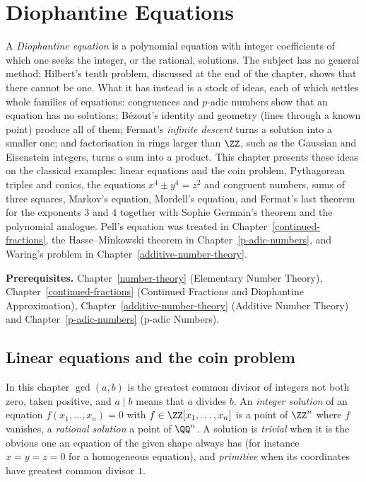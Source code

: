 \chapter{Diophantine Equations}\label{diophantine-equations}

A \emph{Diophantine equation} is a polynomial equation with integer coefficients of which one seeks the integer, or the rational, solutions. The subject has no general method; Hilbert's tenth problem,
discussed at the end of the chapter, shows that there cannot be one. What it has instead is a stock of ideas, each of which settles whole families of equations: congruences and $p$-adic numbers show that an
equation has no solutions; Bézout's identity and geometry (lines through a known point) produce all of them; Fermat's \emph{infinite descent} turns a solution into a smaller one; and factorisation in rings
larger than $\ZZ$, such as the Gaussian and Eisenstein integers, turns a sum into a product. This chapter presents these ideas on the classical examples: linear equations and the coin problem, Pythagorean
triples and conics, the equations $x^4 \pm y^4 = z^2$ and congruent numbers, sums of three squares, Markov's equation, Mordell's equation, and Fermat's last theorem for the exponents $3$ and $4$ together with
Sophie Germain's theorem and the polynomial analogue. Pell's equation was treated in Chapter~\ref{continued-fractions}, the Hasse--Minkowski theorem in Chapter~\ref{p-adic-numbers}, and Waring's problem in
Chapter~\ref{additive-number-theory}.

\noindent\textbf{Prerequisites.} Chapter~\ref{number-theory} (Elementary Number Theory), Chapter~\ref{continued-fractions} (Continued Fractions and Diophantine Approximation), Chapter~\ref{additive-number-theory} (Additive Number Theory) and Chapter~\ref{p-adic-numbers} (p-adic Numbers).

\section{Linear equations and the coin problem}\label{diophantine-equations:section-linear}

\begin{notation}\label{diophantine-equations:notation-diophantine}
In this chapter $\gcd(a, b)$ is the greatest common divisor of integers not both zero, taken positive, and $a \mid b$ means that $a$ divides $b$. An \emph{integer solution} of an equation
$f(x_1, \dots, x_n) = 0$ with $f \in \ZZ[x_1, \dots, x_n]$ is a point of $\ZZ^n$ where $f$ vanishes, a \emph{rational solution} a point of $\QQ^n$. A solution is \emph{trivial} when it is the obvious one an
equation of the given shape always has (for instance $x = y = z = 0$ for a homogeneous equation), and \emph{primitive} when its coordinates have greatest common divisor $1$.
\end{notation}

